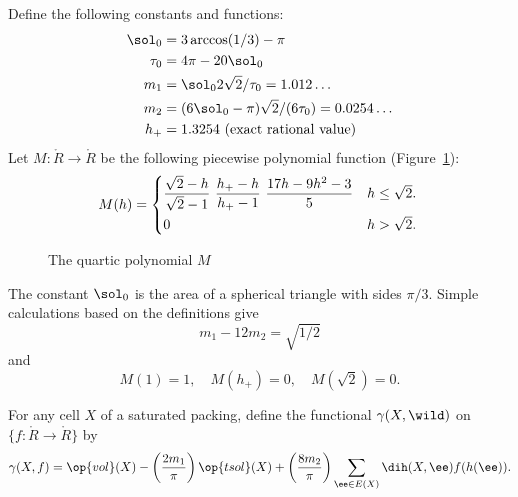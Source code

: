 \begin{definition} 
%
%
%
%
%
%
Define the following constants and functions: 
\begin{align}\label{eqn:m-def} 
\sol_0 &= 3\arccos(1/3)-\pi\\
\tau_0 &= 4\pi  - 20\sol_0\\
m_1 &= \sol_0 2\sqrt2/\tau_0 = 1.012\ldots \\ %
m_2  &=  (6\sol_0- \pi)\sqrt2/(6 \tau_0) = 0.0254\ldots\\ %
h_+ &= 1.3254 \hbox{~(exact rational value)}
\end{align}
Let $M:\ring{R}\to\ring{R}$ 
be the following piecewise polynomial function (Figure~\ref{fig:M}):
\begin{equation}\label{eqn:M} 
M(h) =
\begin{cases} 
\dfrac{\sqrt2-h}{\sqrt2-1}~ \dfrac{h_+-h}{h_+-1} ~\dfrac{17 h - 9 h^2 - 3}{5} 
& h \le \sqrt2.\vspace{3pt} \\
0 & h >\sqrt2.
\end{cases}
\\
\end{equation}
\end{definition}

\begin{figure}[htb]
\centering
{}
\caption{The quartic polynomial $M$}
\label{fig:M}
\end{figure}

The constant $\sol_0$
is the area of a spherical triangle with sides $\pi/3$.
Simple calculations based on the definitions give
\begin{equation}\label{eqn:km}m_1 - 12m_2 = \sqrt{1/2}\end{equation} 
and
\begin{equation}M(1) = 1,\quad M(h_+)=0,\quad M(\sqrt2) =0.\end{equation} 

\begin{definition}[$\gamma$] 
For any cell $X$ of a saturated packing, 
define the functional $\gamma(X,\wild)$ on  $\{f:\ring{R}\to\ring{R}\}$ by
\begin{equation}\label{eqn:gamma-def} 
\gamma(X,f) =  \op{vol}(X)
-\left(\frac{2m_1}{\pi}\right) \op{tsol}(X) + \left(\frac{8m_2}{\pi}\right)
\sum_{\ee\in E(X)} \dih(X,\ee)  f(h(\ee)).
\end{equation}
%
\end{definition}


